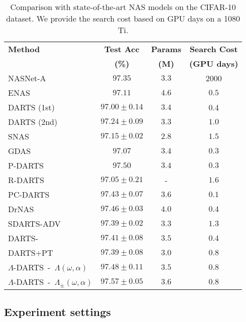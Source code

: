 \documentclass{article} \usepackage{fancyhdr, iclr2023_conference, times}
\newcommand{\mydarts}{$\Lambda$-DARTS\xspace}
\begin{document}
\begin{table}[t!]
\centering
\caption{Comparison with state-of-the-art NAS models on the CIFAR-10 dataset. We provide the search cost based on GPU days on a 1080 Ti.} 
\label{table:search-cost}
\begin{tabular}{l|c|c|c}
\textbf{Method} & \textbf{Test Acc} & \textbf{Params} & \textbf{Search Cost}\\
&  \textbf{(\%)} & \textbf{(M)} & \textbf{(GPU days)} \\\hline
    NASNet-A~\citep{DBLP:conf/cvpr/ZophVSL18} & $97.35$ & $3.3$ & 2000 \\
    ENAS~\citep{DBLP:conf/icml/PhamGZLD18} & $97.11$ & $4.6$ & $0.5$ \\
    DARTS (1st)~\citep{DBLP:conf/iclr/LiuSY19} & $97.00\pm 0.14$ & $3.4$ & 0.4 \\
    DARTS (2nd)~\citep{DBLP:conf/iclr/LiuSY19} & $97.24\pm 0.09$  & $3.3$ & $1.0$ \\
    SNAS~\citep{DBLP:conf/iclr/XieZLL19} & $97.15\pm 0.02$ &  $2.8$ & $1.5$ \\
    GDAS~\citep{DBLP:conf/cvpr/DongY19} & $97.07$ & $3.4$ & $0.3$ \\
    P-DARTS~\citep{DBLP:conf/eccv/LiuZNSHLFYHM18} & $97.50$ & $3.4$ & $0.3$ \\
    R-DARTS~\citep{DBLP:conf/iclr/ZelaESMBH20} & $97.05\pm 0.21$ & - & $1.6$ \\
    PC-DARTS~\citep{DBLP:conf/iclr/XuX0CQ0X20} & $97.43\pm 0.07$ & $3.6$ & $0.1$ \\
    DrNAS~\citep{DBLP:conf/iclr/ChenWCTH21} & $97.46\pm 0.03$ & $4.0$ & $0.4$ \\
    SDARTS-ADV~\citep{DBLP:conf/icml/ChenH20} & $97.39\pm 0.02$ & $3.3$ & $1.3$ \\
    DARTS-~\citep{DBLP:conf/iclr/ChuW0LWY21} & $97.41\pm 0.08$ & $3.5$ & $0.4$ \\
    DARTS+PT~\citep{DBLP:conf/iclr/WangCCTH21} & $97.39\pm 0.08$ & $3.0$ & $0.8$ \\
    
    \hline
    \mydarts~-~$\Lambda(\omega, \alpha)$ & $97.48\pm0.11$ & $3.5$ & $0.8$ \\
    \mydarts~-~$\Lambda_\pm(\omega, \alpha)$ & $\mathbf{97.57\pm 0.05}$ & $3.6$ & $0.8$\\
\end{tabular}
\end{table}
\subsection{Experiment settings}
\label{appndx:exp-setting}
\end{document}
